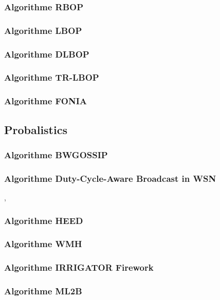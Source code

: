 \subsubsection{Algorithme RBOP}
\cite{cartigny2005}
\subsubsection{Algorithme LBOP}
\cite{cartigny2005}
\subsubsection{Algorithme DLBOP}
\cite{DLBOP04}
\subsubsection{Algorithme TR-LBOP}
\cite{TRLBOP}
\subsubsection{Algorithme FONIA}




\subsection{Probalistics}


\subsubsection{Algorithme BWGOSSIP}
\cite{lutzeler2011}
\subsubsection{Algorithme Duty-Cycle-Aware Broadcast in WSN }
\cite{Wang09},\cite{Wang10}
\subsubsection{Algorithme HEED}
\cite{Younis04}
\subsubsection{Algorithme WMH}
\cite{WMH05}
\subsubsection{Algorithme IRRIGATOR  Firework}
\cite{orecchia2004}
\subsubsection{Algorithme ML2B}
\cite{zhaobroadcast}
